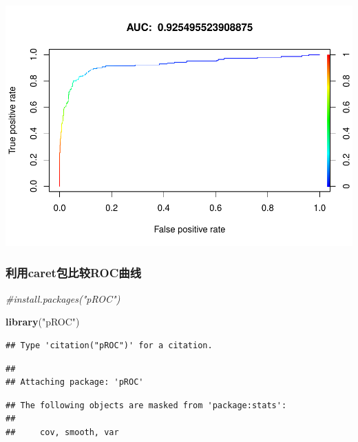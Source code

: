 \documentclass[
]{article}
\newenvironment{Shaded}{\begin{snugshade}}{\end{snugshade}}
\newcommand{\CommentTok}[1]{\textcolor[rgb]{0.56,0.35,0.01}{\textit{#1}}}
\newcommand{\KeywordTok}[1]{\textcolor[rgb]{0.13,0.29,0.53}{\textbf{#1}}}
\newcommand{\NormalTok}[1]{#1}
\newcommand{\StringTok}[1]{\textcolor[rgb]{0.31,0.60,0.02}{#1}}
\begin{document}
\includegraphics{R_FinalReport_files/figure-latex/unnamed-chunk-44-1.pdf}

\hypertarget{ux5229ux7528caretux5305ux6bd4ux8f83rocux66f2ux7ebf}{%
\subsubsection{利用caret包比较ROC曲线}\label{ux5229ux7528caretux5305ux6bd4ux8f83rocux66f2ux7ebf}}

\begin{Shaded}
\begin{Highlighting}[]
\CommentTok{#install.packages("pROC")}

\KeywordTok{library}\NormalTok{(}\StringTok{"pROC"}\NormalTok{)}
\end{Highlighting}
\end{Shaded}

\begin{verbatim}
## Type 'citation("pROC")' for a citation.
\end{verbatim}

\begin{verbatim}
## 
## Attaching package: 'pROC'
\end{verbatim}

\begin{verbatim}
## The following objects are masked from 'package:stats':
## 
##     cov, smooth, var
\end{verbatim}
\end{document}
